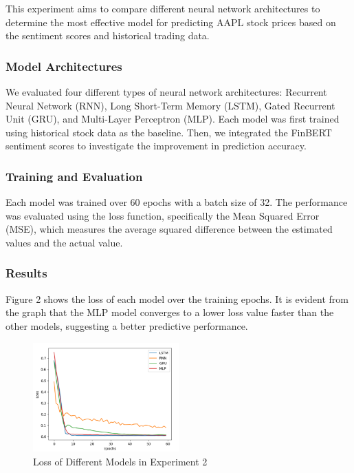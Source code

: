 \documentclass[11pt,a4paper]{article}
\begin{document}
  This experiment aims to compare different neural network architectures to determine the most effective model for predicting AAPL stock prices based on the sentiment scores and historical trading data.
  
  \subsubsection{Model Architectures}
  We evaluated four different types of neural network architectures: Recurrent Neural Network (RNN), Long Short-Term Memory (LSTM), Gated Recurrent Unit (GRU), and Multi-Layer Perceptron (MLP). Each model was first trained using historical stock data as the baseline. Then, we integrated the FinBERT sentiment scores to investigate the improvement in prediction accuracy.
  
  \subsubsection{Training and Evaluation}
  Each model was trained over 60 epochs with a batch size of 32. The performance was evaluated using the loss function, specifically the Mean Squared Error (MSE), which measures the average squared difference between the estimated values and the actual value.
  
  \subsubsection{Results}
  Figure 2 shows the loss of each model over the training epochs. It is evident from the graph that the MLP model converges to a lower loss value faster than the other models, suggesting a better predictive performance.
  
  \begin{figure}[ht]
  \centering
  \includegraphics[width=0.5\textwidth]{figs/2023-11-29_230313.jpg}
  \caption{Loss of Different Models in Experiment 2}
  \label{fig:loss_comparison}
  \end{figure}
  
\end{document}

